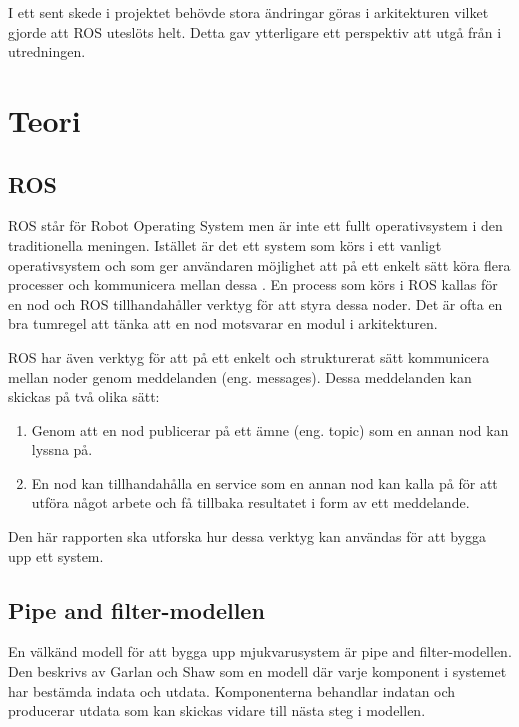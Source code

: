 I ett sent skede i projektet behövde stora ändringar göras i arkitekturen vilket gjorde att ROS uteslöts helt. Detta gav ytterligare ett perspektiv att utgå från i utredningen.


\section{Teori}
\label{sec:theory-lundberg}

\subsection{ROS}
ROS står för Robot Operating System men är inte ett fullt operativsystem i den traditionella meningen. Istället är det ett system som körs i ett vanligt operativsystem och som ger användaren möjlighet att på ett enkelt sätt köra flera processer och kommunicera mellan dessa \cite{quigley2009ros}. En process som körs i ROS kallas för en nod och ROS tillhandahåller verktyg för att styra dessa noder. Det är ofta en bra tumregel att tänka att en nod motsvarar en modul i arkitekturen.

ROS har även verktyg för att på ett enkelt och strukturerat sätt kommunicera mellan noder genom meddelanden (eng. messages). Dessa meddelanden kan skickas på två olika sätt:

\begin{enumerate}
	\item Genom att en nod publicerar på ett ämne (eng. topic) som en annan nod kan lyssna på.
	
	\item En nod kan tillhandahålla en service som en annan nod kan kalla på för att utföra något arbete och få tillbaka resultatet i form av ett meddelande.
\end{enumerate}

Den här rapporten ska utforska hur dessa verktyg kan användas för att bygga upp ett system.

\subsection{Pipe and filter-modellen}
En välkänd modell för att bygga upp mjukvarusystem är pipe and filter-modellen. Den beskrivs av Garlan och Shaw \cite{garlan1993introduction} som en modell där varje komponent i systemet har bestämda indata och utdata. Komponenterna behandlar indatan och producerar utdata som kan skickas vidare till nästa steg i modellen.

